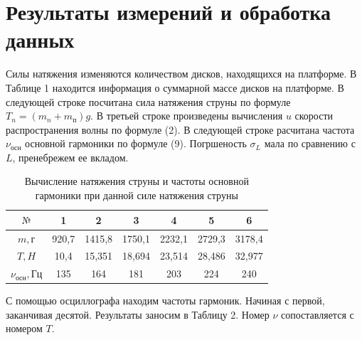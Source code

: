 \documentclass[a4paper,12pt]{article} %
\begin{document}
\section{Результаты измерений и обработка данных}
Силы натяжения изменяются количеством дисков, находящихся на платформе. В Таблице 1 находится информация о суммарной массе дисков на платформе. В следующей строке посчитана сила натяжения струны по формуле $T_n = (m_n+m_\text{п})g$. В третьей строке произведены вычисления $u$ скорости распространения волны по формуле  (2). В следующей строке расчитана частота $\nu_\text{осн}$ основной гармоники по формуле (9). Погршеность $\sigma_L$ мала по сравнению с $L$, пренебрежем ее вкладом. 
\newpage
\begin{table}[h]
\centering
\begin{tabular}{|c|c|c|c|c|c|c|}
\hline
$\text{№}$ & 1 & 2 & 3 & 4 & 5 & 6 \\ \hline
$m,\text{г}$ & 920,7 & 1415,8 & 1750,1 & 2232,1 & 2729,3 & 3178,4 \\ \hline
$T, H$ &10,4 & 15,351 & 18,694 & 23,514 & 28,486 & 32,977\\ \hline
$\nu_\text{осн}, \text{Гц}$ & 135 & 164 & 181 & 203 & 224 & 240\\ \hline

\end{tabular}
\caption {Вычисление натяжения струны и частоты основной гармоники при данной силе натяжения струны}
\end{table}


С помощью осциллографа находим частоты гармоник. Начиная с первой,  заканчивая десятой. Результаты заносим в Таблицу 2. Номер $\nu$ сопоставляется с номером $T$.
\end{document}
